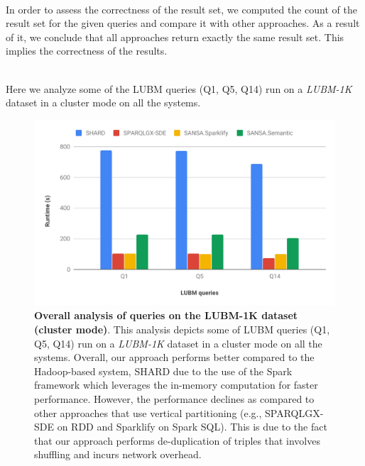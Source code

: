 ~\\ 
In order to assess the correctness of the result set, we computed the count of the result set for the given queries and compare it with other approaches.
As a result of it, we conclude that all approaches return exactly the same result set.
This implies the correctness of the results.

~\\ 
Here we analyze some of the LUBM queries (Q1, Q5, Q14) run on a \textit{LUBM-1K} dataset in a cluster mode on all the systems.

\begin{figure}
   \includegraphics[width=1.0\columnwidth]{images/6_scalable_rdf_querying/semantic-based-overall-analysis.pdf}
    \caption{\textbf{Overall analysis of queries on the LUBM-1K dataset (cluster mode)}.
    This analysis depicts some of LUBM queries (Q1, Q5, Q14) run on a \textit{LUBM-1K} dataset in a cluster mode on all the systems. 
    Overall, our approach performs better compared to the Hadoop-based system, SHARD due to the use of the Spark framework which leverages the in-memory computation for faster performance.
    However, the performance declines as compared to other approaches that use vertical partitioning (e.g., SPARQLGX-SDE on RDD and Sparklify on Spark SQL).
    This is due to the fact that our approach performs de-duplication of triples that involves shuffling and incurs network overhead.
    }
    \label{fig:semantic-based-overall-analysis}
\end{figure}

